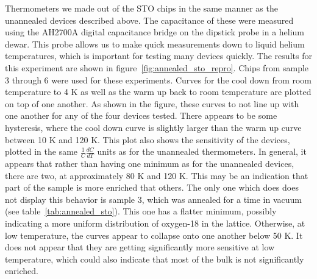 \documentclass{thesis-umich}
\begin{document}
Thermometers we made out of the STO chips in the same manner as the unannealed devices described above. The capacitance of these were measured using the AH2700A digital capacitance bridge on the dipstick probe in a helium dewar. This probe allows us to make quick measurements down to liquid helium temperatures, which is important for testing many devices quickly. The results for this experiment are shown in figure~\ref{fig:annealed_sto_repro}. Chips from sample 3 through 6 were used for these experiments. Curves for the cool down from room temperature to 4 K as well as the warm up back to room temperature are plotted on top of one another. As shown in the figure, these curves to not line up with one another for any of the four devices tested. There appears to be some hysteresis, where the cool down curve is slightly larger than the warm up curve between 10 K and 120 K. This plot also shows the sensitivity of the devices, plotted in the same $\frac{1}{C}\frac{dC}{dT}$ units as for the unannealed thermometers. In general, it appears that rather than having one minimum as for the unannealed devices, there are two, at approximately 80 K and 120 K. This may be an indication that part of the sample is more enriched that others. The only one which does does not display this behavior is sample 3, which was annealed for a time in vacuum (see table~\ref{tab:annealed_sto}). This one has a flatter minimum, possibly indicating a more uniform distribution of oxygen-18 in the lattice. Otherwise, at low temperature, the curves appear to collapse onto one another below 50 K. It does not appear that they are getting significantly more sensitive at low temperature, which could also indicate that most of the bulk is not significantly enriched.
\end{document}
